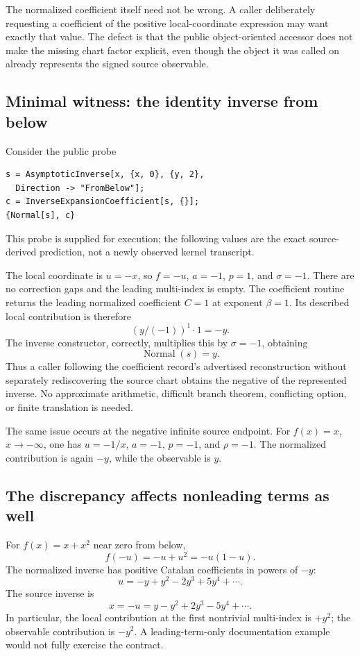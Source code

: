 \documentclass[11pt,letterpaper]{article}
\begin{document}
The normalized coefficient itself need not be wrong. A caller deliberately requesting a coefficient of the positive local-coordinate expression may want exactly that value. The defect is that the public object-oriented accessor does not make the missing chart factor explicit, even though the object it was called on already represents the signed source observable.

\subsection{Minimal witness: the identity inverse from below}
Consider the public probe
\par\noindent\begin{minipage}{\linewidth}
\begin{lstlisting}
s = AsymptoticInverse[x, {x, 0}, {y, 2},
  Direction -> "FromBelow"];
c = InverseExpansionCoefficient[s, {}];
{Normal[s], c}
\end{lstlisting}
\end{minipage}\par
This probe is supplied for execution; the following values are the exact source-derived prediction, not a newly observed kernel transcript.

The local coordinate is \(u=-x\), so \(f=-u\), \(a=-1\), \(p=1\), and \(\sigma=-1\). There are no correction gaps and the leading multi-index is empty. The coefficient routine returns the leading normalized coefficient \(C=1\) at exponent \(\beta=1\). Its described local contribution is therefore
\[
 (y/(-1))^1\cdot1=-y.
\]
The inverse constructor, correctly, multiplies this by \(\sigma=-1\), obtaining
\[
 \operatorname{Normal}(s)=y.
\]
Thus a caller following the coefficient record's advertised reconstruction without separately rediscovering the source chart obtains the negative of the represented inverse. No approximate arithmetic, difficult branch theorem, conflicting option, or finite translation is needed.

The same issue occurs at the negative infinite source endpoint. For \(f(x)=x\), \(x\to-\infty\), one has \(u=-1/x\), \(a=-1\), \(p=-1\), and \(\rho=-1\). The normalized contribution is again \(-y\), while the observable is \(y\).

\subsection{The discrepancy affects nonleading terms as well}
For \(f(x)=x+x^2\) near zero from below,
\[
 f(-u)=-u+u^2=-u(1-u).
\]
The normalized inverse has positive Catalan coefficients in powers of \(-y\):
\[
 u=-y+y^2-2y^3+5y^4+\cdots.
\]
The source inverse is
\[
 x=-u=y-y^2+2y^3-5y^4+\cdots.
\]
In particular, the local contribution at the first nontrivial multi-index is \(+y^2\); the observable contribution is \(-y^2\). A leading-term-only documentation example would not fully exercise the contract.
\end{document}
